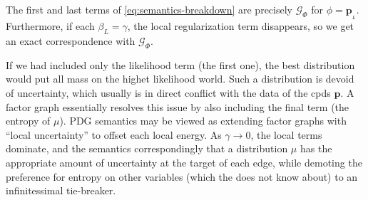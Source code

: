 \documentclass[letterpaper]{article} %
\theoremstyle{plain}
\theoremstyle{definition}
\theoremstyle{remark}
\newcommand\mat[1]{\mathbf{#1}}
\newcommand{\bp}[1][L]{\mat{p}_{\!_{#1}\!}}
\begin{document}
%
The first and last terms of
\eqref{eq:semantics-breakdown} are precisely $\mathcal G_\Phi$ for
$\phi = \bp$.
Furthermore, if each
$\beta_L = \gamma$, the local regularization term
disappears, so we get an exact correspondence with $\mathcal G_\Phi$.

If we had included only the likelihood term (the first one), 
the best distribution would put all mass on the highet likelihood world. Such a
distribution is devoid of uncertainty, which usually is in direct conflict with
the data of the cpds $\mat p$. A factor graph essentially resolves this issue by
also including the final term (the entropy of $\mu$). 
PDG semantics may be viewed as extending factor graphs with ``local
uncertainty'' to offset each local energy. As $\gamma \to 0$, the local terms
dominate, and the semantics correspondingly that a distribution $\mu$ has the
appropriate amount of uncertainty at the target of each edge, while demoting the
preference for entropy on other variables (which the does not know about) to an
infinitessimal tie-breaker.
\end{document}
